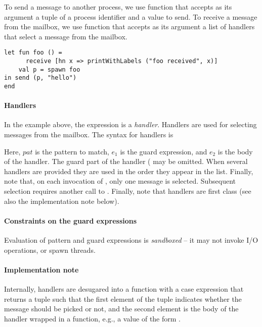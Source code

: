 To send a message to another process, we use function  that accepts as its argument a tuple of
a process identifier and a value to send. To receive a message from the mailbox, we use function 
that accepts as its argument a list of handlers that select a message from the mailbox.



\begin{lstlisting}
let fun foo () =
      receive [hn x => printWithLabels ("foo received", x)]
    val p = spawn foo
in send (p, "hello")
end    
\end{lstlisting}


\paragraph{Handlers}\label{sec:handlers} 
In the example above, the expression  is a \emph{handler}. 
Handlers are used for selecting messages from the mailbox. The syntax for handlers is
\begin{center}
 \end{center}
 
 Here, $\mathit{pat}$ is the pattern to match, $\mathit{e_1}$ is the guard expression, and $\mathit{e_2}$ is the body of the handler. 
 The guard part of the handler ( may be omitted. 
 When several handlers are provided they are used in the order they appear in the list.
Finally, note that, on each invocation of , only one message is selected. Subsequent selection
requires another call to .
Finally, note that handlers are first class (see also the implementation note below).  

\paragraph{Constraints on the guard expressions}
Evaluation of pattern and guard expressions is \emph{sandboxed} -- it may not invoke I/O operations, or 
spawn threads.


\paragraph{Implementation note} 
Internally, handlers are desugared into a function with a case expression that returns a tuple such that the first 
element of the tuple indicates whether the message should be picked or not, and the second element is the body 
of the handler wrapped in a function, e.g., a value of the form .



